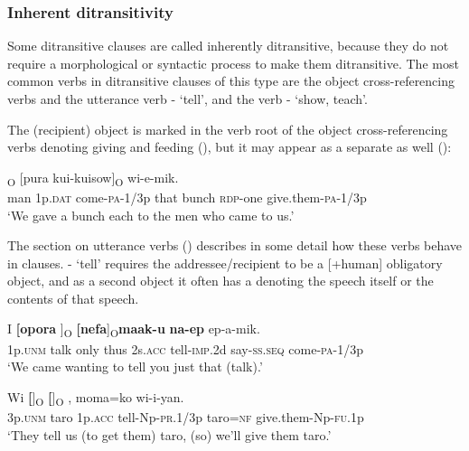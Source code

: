 \subsubsection[Inherent ditransitivity ]{Inherent ditransitivity} 
\hypertarget{RefHeading22021935131865}{}
Some  ditransitive clauses are called inherently ditransitive, because they do not require a morphological or syntactic process to make them ditransitive. The most common verbs in ditransitive clauses of this type are the object cross-referencing verbs and the utterance verb - `tell', and the verb - `show, teach'.

The (recipient) object is marked in the verb root of the object cross-referencing verbs denoting giving and feeding (), but it may appear as a separate  as well ():

\ea%
\label{ex:x950}
\textsubscript{O}  [pura  kui-kuisow]\textsubscript{O} wi-e-mik. \\
     man  1p.\textsc{dat}  come-\textsc{pa}-1/3p  that  bunch  \textsc{rdp}-one give.them-\textsc{pa}-1/3p \\
\glt `We gave a bunch each to the men who came to us.'
\z

The section on utterance verbs () describes in some detail how these verbs behave in clauses. - `tell' requires the addressee/recipient to be a [+human] obligatory object, and as a second object it often has a  denoting the speech itself or the contents of that speech. 

\ea%
\label{ex:x1839}
\gll I  \textbf{[}\textbf{opora}  ]\textsubscript{O}  \textbf{[}\textbf{nefa}]\textsubscript{O}\textbf{maak-u} \textbf{na-ep} ep-a-mik. \\
     1p.\textsc{unm}  talk  only  thus  2s.\textsc{acc}  tell-\textsc{imp}.2d  say-\textsc{ss}.\textsc{seq} come-\textsc{pa}-1/3p \\
\glt `We came wanting to tell you just that (talk).'
\z

\ea%
\label{ex:x955}
\gll Wi  \textbf{[}]\textsubscript{O}  \textbf{[}]\textsubscript{O}  ,  moma=ko wi-i-yan. \\
     3p.\textsc{unm}  taro  1p.\textsc{acc}  tell-Np-\textsc{pr}.1/3p  taro=\textsc{nf} give.them-Np-\textsc{fu}.1p \\
\glt `They tell us (to get them) taro, (so) we'll give them taro.'
\z

